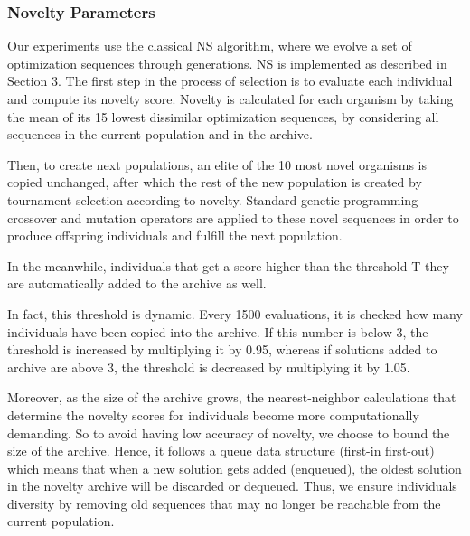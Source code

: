 \subsubsection{Novelty Parameters}
Our experiments use the classical NS algorithm, where we evolve a set of optimization sequences through generations.
NS is implemented as described in Section 3.
The first step in the process of selection is to evaluate each individual and compute its novelty score. Novelty is calculated for each organism by taking the mean of its 15 lowest dissimilar optimization sequences, by considering all sequences in the current population and in the archive. 

Then, to create next populations, an elite of the 10 most novel organisms is copied unchanged, after which the rest of the new population is created by tournament selection according to novelty. Standard genetic programming crossover and mutation operators are applied to these novel sequences in order to produce offspring individuals and fulfill the next population.

In the meanwhile, individuals that get a score higher than the threshold T they are automatically added to the archive as well. 

In fact, this threshold is dynamic. Every 1500 evaluations, it is checked how many individuals have been copied into the archive. If this number is below 3, the threshold is increased by multiplying it by 0.95, whereas if solutions added to archive are above 3, the threshold is decreased by multiplying it by 1.05. 

Moreover, as the size of the archive grows, the nearest-neighbor calculations that determine the novelty scores for individuals become more computationally demanding. So to avoid having low accuracy of novelty, we choose to bound the size of the archive. Hence, it follows a queue data structure (first-in first-out) which means that when a new solution gets added (enqueued), the oldest solution in the novelty archive will be discarded or dequeued. Thus, we ensure individuals diversity by removing old sequences that may no longer be reachable from the current population.

